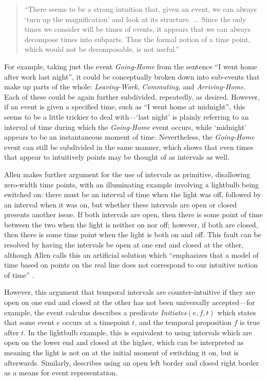\documentclass[a4paper,12pt,leqno,twoside]{article}
\begin{document}
{
\onehalfspacing
\begin{quotation}
\noindent
``There seems to be a strong intuition that, given an event, we can always `turn up the magnification' and look at its structure. ... Since the only times we consider will be times of events, it appears that we can always decompose times into subparts. Thus the formal notion of a time point, which would not be decomposable, is not useful.'' \citep[p. 834]{allen1983maintaining}
\end{quotation}
}
\noindent
For example, taking just the event \textit{Going-Home} from the sentence ``I went home after work last night'', it could be conceptually broken down into sub-events that make up parts of the whole: \textit{Leaving-Work}, \textit{Commuting}, and \textit{Arriving-Home}. Each of these could be again further subdivided, repeatedly, as desired. However, if an event is given a specified time, such as ``I went home at midnight'', this seems to be a little trickier to deal with---`last night' is plainly referring to an interval of time during which the \textit{Going-Home} event occurs, while `midnight' appears to be an instantaneous moment of time. Nevertheless, the \textit{Going-Home} event can still be subdivided in the same manner, which shows that even times that appear to intuitively points may be thought of as intervals as well.

Allen makes further argument for the use of intervals as primitive, disallowing zero-width time points, with an illuminating example involving a lightbulb being switched on: there must be an interval of time when the light was off, followed by an interval when it was on, but whether these intervals are open or closed presents another issue. If both intervals are open, then there is some point of time between the two when the light is neither on nor off; however, if both are closed, then there is some time point when the light is both on and off. This fault can be resolved by having the intervals be open at one end and closed at the other, although Allen calls this an artificial solution which ``emphasizes that a model of time based on points on the real line does not correspond to our intuitive notion of time'' \citeyearpar[p. 834]{allen1983maintaining}.

However, this argument that temporal intervals are counter-intuitive if they are open on one end and closed at the other has not been universally accepted---for example, the event calculus \citep{Kowalski1986,Miller1999,Mueller2008} describes a predicate \textit{Initiates}$(e, f, t)$ which states that some event $e$ occurs at a timepoint $t$, and the temporal proposition $f$ is true after $t$. In the lightbulb example, this is equivalent to using intervals which are open on the lower end and closed at the higher, which can be interpreted as meaning the light is not on at the initial moment of switching it on, but is afterwards. Similarly, \citet{Fernando2018} describes using an open left border and closed right border as a means for event representation.
\end{document}

